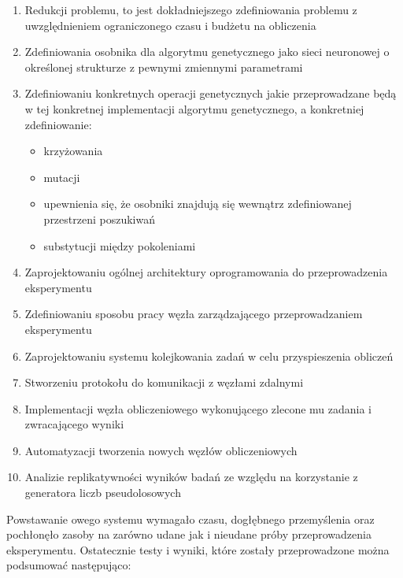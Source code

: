 \begin{enumerate}
  \item Redukcji problemu, to jest dokładniejszego zdefiniowania problemu z uwzględnieniem ograniczonego czasu i budżetu na obliczenia
  \item Zdefiniowania osobnika dla algorytmu genetycznego jako sieci neuronowej o określonej strukturze z pewnymi zmiennymi parametrami
  \item Zdefiniowaniu konkretnych operacji genetycznych jakie przeprowadzane będą w tej konkretnej implementacji algorytmu genetycznego, a konkretniej zdefiniowanie:
  \begin{itemize}
    \item krzyżowania
    \item mutacji
    \item upewnienia się, że osobniki znajdują się wewnątrz zdefiniowanej przestrzeni poszukiwań
    \item substytucji między pokoleniami
  \end{itemize}
  \item Zaprojektowaniu ogólnej architektury oprogramowania do przeprowadzenia eksperymentu
  \item Zdefiniowaniu sposobu pracy węzła zarządzającego przeprowadzaniem eksperymentu
  \item Zaprojektowaniu systemu kolejkowania zadań w celu przyspieszenia obliczeń
  \item Stworzeniu protokołu do komunikacji z węzłami zdalnymi
  \item Implementacji węzła obliczeniowego wykonującego zlecone mu zadania i zwracającego wyniki
  \item Automatyzacji tworzenia nowych węzłów obliczeniowych
  \item Analizie replikatywności wyników badań ze względu na korzystanie z generatora liczb pseudolosowych
\end{enumerate}

Powstawanie owego systemu wymagało czasu, dogłębnego przemyślenia oraz pochłonęło zasoby na zarówno udane jak i nieudane próby przeprowadzenia eksperymentu.
Ostatecznie testy i wyniki, które zostały przeprowadzone można podsumować następująco:

